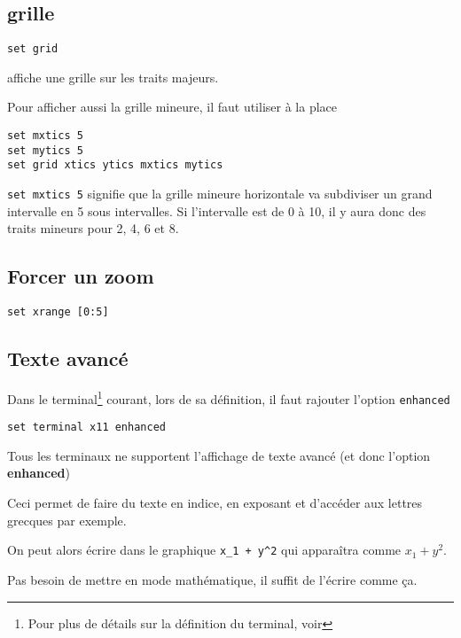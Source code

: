 \documentclass[a4paper,twoside]{article}
\begin{document}
\subsection{grille}
\begin{verbatim}
set grid
\end{verbatim}
affiche une grille sur les traits majeurs.

Pour afficher aussi la grille mineure, il faut utiliser à la place 
\begin{verbatim}
set mxtics 5
set mytics 5
set grid xtics ytics mxtics mytics
\end{verbatim}

\begin{remarque}
\texttt{set mxtics 5} signifie que la grille mineure horizontale va subdiviser un grand intervalle en 5 sous intervalles. Si l'intervalle est de 0 à 10, il y aura donc des traits mineurs pour 2, 4, 6 et 8. 
\end{remarque}



\subsection{Forcer un zoom}
\begin{verbatim}
set xrange [0:5]
\end{verbatim}

\subsection{Texte avancé}
Dans le terminal\footnote{Pour plus de détails sur la définition du terminal, voir } courant, lors de sa définition, il faut rajouter l'option \texttt{enhanced}

\begin{verbatim}
set terminal x11 enhanced
\end{verbatim}

\begin{attention}
Tous les terminaux ne supportent l'affichage de texte avancé (et donc l'option \textbf{enhanced})
\end{attention}


Ceci permet de faire du texte en indice, en exposant et d'accéder aux lettres grecques par exemple. 

On peut alors écrire dans le graphique \verb|x_1 + y^2| qui apparaîtra comme $x_1 + y^2$.

\begin{remarque}
Pas besoin de mettre en mode mathématique, il suffit de l'écrire comme ça.
\end{remarque}
\end{document}
